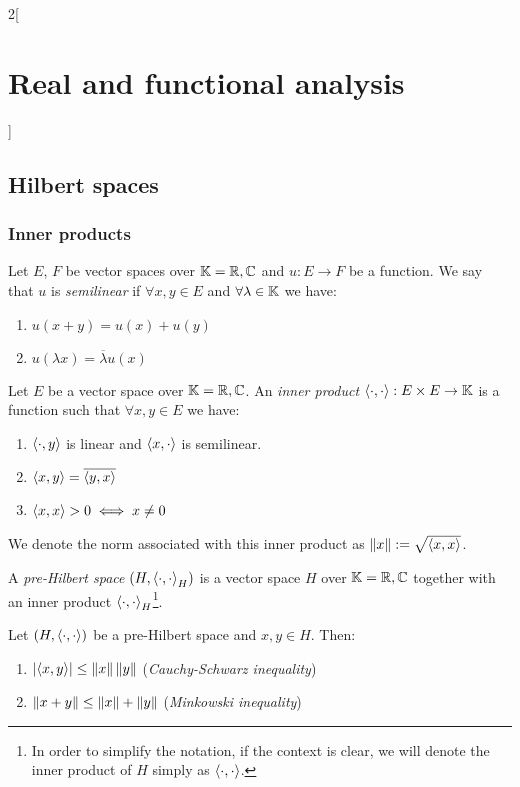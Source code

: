 \documentclass[../../../main_math.tex]{subfiles}
\begin{document}
\begin{multicols}{2}[\section{Real and functional analysis}]
  \subsection{Hilbert spaces}
  \subsubsection{Inner products}
  \begin{definition}
    Let $E$, $F$ be vector spaces over $\mathbb{K}=\mathbb{R},\mathbb{C}$ and $u:E\rightarrow F$ be a function. We say that $u$ is \emph{semilinear} if $\forall x,y\in E$ and $\forall\lambda\in \mathbb{K}$ we have:
    \begin{enumerate}
      \item $u(x+y)=u(x)+u(y)$
      \item $u(\lambda x)=\overline{\lambda}u(x)$
    \end{enumerate}
  \end{definition}
  \begin{definition}
    Let $E$ be a vector space over $\mathbb{K}=\mathbb{R},\mathbb{C}$. An \emph{inner product} ${\left\langle\cdot,\cdot\right\rangle}: E\times E\rightarrow\mathbb{K}$ is a function such that $\forall x,y\in E$ we have:
    \begin{enumerate}
      \item ${\left\langle\cdot,y\right\rangle}$ is linear and ${\left\langle x,\cdot\right\rangle}$ is semilinear.
      \item ${\left\langle x,y\right\rangle}=\overline{{\left\langle y,x\right\rangle}}$
      \item ${\left\langle x,x\right\rangle}>0 \iff x\ne 0$
    \end{enumerate}
    We denote the norm associated with this inner product as $\left\|x\right\|:=\sqrt{{\left\langle x,x\right\rangle}}$.
  \end{definition}
  \begin{definition}
    A \emph{pre-Hilbert space} $(H,{\left\langle\cdot,\cdot\right\rangle}_H)$ is a vector space $H$ over $\mathbb{K}=\mathbb{R},\mathbb{C}$ together with an inner product ${\left\langle\cdot,\cdot\right\rangle}_H$\footnote{In order to simplify the notation, if the context is clear, we will denote the inner product of $H$ simply as ${\left\langle\cdot,\cdot\right\rangle}$.}.
  \end{definition}
  \begin{proposition}
    Let $(H,{\left\langle\cdot,\cdot\right\rangle})$ be a pre-Hilbert space and $x,y\in H$. Then:
    \begin{enumerate}
      \item $\displaystyle \abs{{\left\langle x,y\right\rangle}}\leq \left\|x\right\|\left\|y\right\|$ (\emph{Cauchy-Schwarz inequality})
      \item $\left\|x+y\right\|\leq \left\|x\right\| + \left\|y\right\|$ (\emph{Minkowski inequality})

\end{enumerate}
\end{proposition}
\end{multicols}
\end{document}

